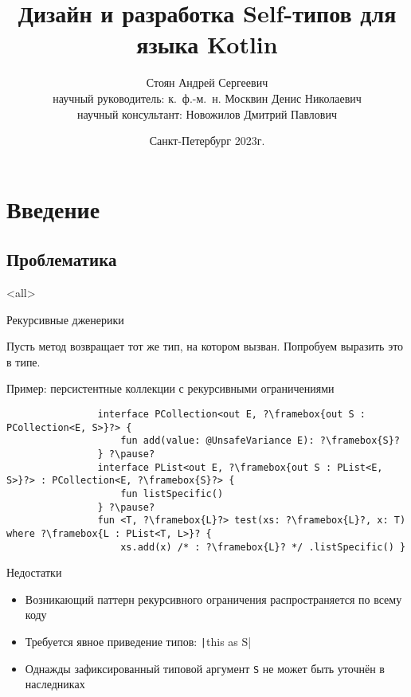 \documentclass[handout,aspectratio=169,usenames,dvipsnames]{beamer}
\author[Андрей Стоян]{Стоян Андрей Сергеевич \\ {\footnotesize научный руководитель: к.~ф.-м.~н.} Москвин Денис Николаевич \\ {\footnotesize научный консультант:} Новожилов Дмитрий Павлович}
\institute[ИТМО/SE]{Университет ИТМО\\Разработка программного обеспечения/Software engineering}
\title[Дизайн и разработка Self-типов для языка Kotlin]{Дизайн и разработка Self-типов для языка Kotlin}
\date{Санкт-Петербург 2023г.}
\begin{document}
    \maketitle



    \section{Введение}


    \subsection{Проблематика}

    \mode<all>
    \begin{frame}[fragile]{Рекурсивные дженерики}

        Пусть метод возвращает тот же тип, на котором вызван.
        Попробуем выразить это в типе.

        \begin{block}{Пример: персистентные коллекции с рекурсивными ограничениями}
            \begin{verbatim}
                interface PCollection<out E, ?\framebox{out S : PCollection<E, S>}?> {
                    fun add(value: @UnsafeVariance E): ?\framebox{S}?
                } ?\pause?
                interface PList<out E, ?\framebox{out S : PList<E, S>}?> : PCollection<E, ?\framebox{S}?> {
                    fun listSpecific()
                } ?\pause?
                fun <T, ?\framebox{L}?> test(xs: ?\framebox{L}?, x: T) where ?\framebox{L : PList<T, L>}? {
                    xs.add(x) /* : ?\framebox{L}? */ .listSpecific() }
            \end{verbatim}
        \end{block}

        \pause

        \begin{block}{Недостатки}
            \begin{itemize}
                \item Возникающий паттерн рекурсивного ограничения распространяется по всему коду
                \item Требуется явное приведение типов: \texttt|this as S|
                \item Однажды зафиксированный типовой аргумент \texttt{S} не может быть уточнён в наследниках
            \end{itemize}
        \end{block}
    \end{frame}
    \mode*
\end{document}
